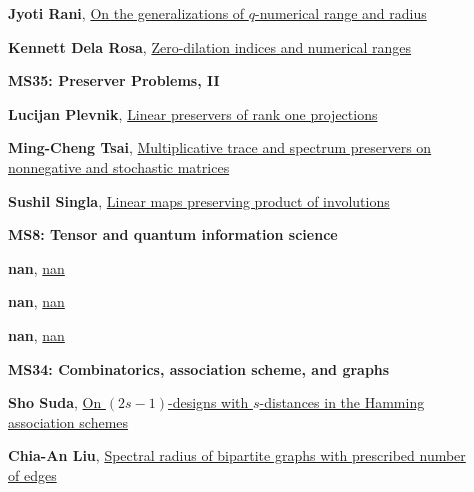 \documentclass[ILAS2025-program.tex]{subfiles}
\begin{document}
\begin{description}
\begin{description}
        \item[] \hypertarget{up0278}{}\textbf{Jyoti Rani}, \hyperlink{down0278}{On the generalizations of $q$-numerical range and radius}
        \item[] \hypertarget{up0279}{}\textbf{Kennett Dela Rosa}, \hyperlink{down0279}{Zero-dilation indices and numerical ranges}
        \end{description}
    \begin{description}
    \item[] {\color{mstitle}\textbf{MS35: Preserver Problems, II}} 
    \item[] \hypertarget{up0280}{}\textbf{Lucijan Plevnik}, \hyperlink{down0280}{Linear preservers of rank one projections}
        \item[] \hypertarget{up0281}{}\textbf{Ming-Cheng Tsai}, \hyperlink{down0281}{Multiplicative trace and spectrum preservers  on   nonnegative and stochastic matrices
}
        \item[] \hypertarget{up0282}{}\textbf{Sushil Singla}, \hyperlink{down0282}{Linear maps preserving product of involutions}
        \end{description}
    \begin{description}
    \item[] {\color{mstitle}\textbf{MS8: Tensor and quantum information science}} 
    \item[] \hypertarget{up0283}{}\textbf{nan}, \hyperlink{down0283}{nan}
        \item[] \hypertarget{up0284}{}\textbf{nan}, \hyperlink{down0284}{nan}
        \item[] \hypertarget{up0285}{}\textbf{nan}, \hyperlink{down0285}{nan}
        \end{description}
    \begin{description}
    \item[] {\color{mstitle}\textbf{MS34: Combinatorics, association scheme, and graphs}} 
    \item[] \hypertarget{up0286}{}\textbf{Sho Suda}, \hyperlink{down0286}{On $(2s-1)$-designs with $s$-distances in the Hamming association schemes
}
        \item[] \hypertarget{up0287}{}\textbf{Chia-An Liu}, \hyperlink{down0287}{Spectral radius of bipartite graphs with prescribed number of edges}

\end{description}
\end{description}
\end{document}
